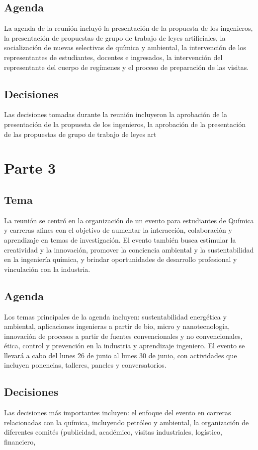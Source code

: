 \documentclass{article}
\begin{document}
\subsection{Agenda}
La agenda de la reunión incluyó la presentación de la propuesta de los ingenieros, la presentación de propuestas de grupo de trabajo de leyes artificiales, la socialización de nuevas selectivas de química y ambiental, la intervención de los representantes de estudiantes, docentes e ingresados, la intervención del representante del cuerpo de regímenes y el proceso de preparación de las visitas.

\subsection{Decisiones}
Las decisiones tomadas durante la reunión incluyeron la aprobación de la presentación de la propuesta de los ingenieros, la aprobación de la presentación de las propuestas de grupo de trabajo de leyes art
\section{Parte 3}
\subsection{Tema}
La reunión se centró en la organización de un evento para estudiantes de Química y carreras afines con el objetivo de aumentar la interacción, colaboración y aprendizaje en temas de investigación. El evento también busca estimular la creatividad y la innovación, promover la conciencia ambiental y la sustentabilidad en la ingeniería química, y brindar oportunidades de desarrollo profesional y vinculación con la industria.
\subsection{Agenda}
Los temas principales de la agenda incluyen: sustentabilidad energética y ambiental, aplicaciones ingenieras a partir de bio, micro y nanotecnología, innovación de procesos a partir de fuentes convencionales y no convencionales, ética, control y prevención en la industria y aprendizaje ingeniero. El evento se llevará a cabo del lunes 26 de junio al lunes 30 de junio, con actividades que incluyen ponencias, talleres, paneles y conversatorios.
\subsection{Decisiones}
Las decisiones más importantes incluyen: el enfoque del evento en carreras relacionadas con la química, incluyendo petróleo y ambiental, la organización de diferentes comités (publicidad, académico, visitas industriales, logístico, financiero,
\end{document}
